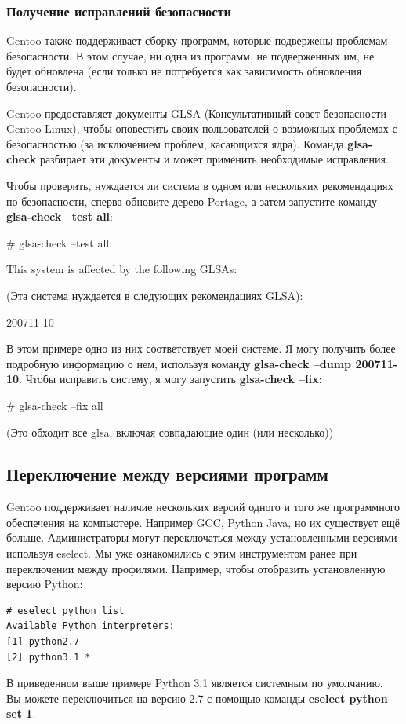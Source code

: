 \documentclass[10pt]{book}
\begin{document}
\subsubsection{Получение исправлений безопасности}

Gentoo также поддерживает сборку программ, которые подвержены проблемам безопасности. В этом случае, ни одна из программ, не подверженных им, не будет обновлена (если только не потребуется как зависимость обновления безопасности).

Gentoo предоставляет документы GLSA (Консультативный совет безопасности Gentoo Linux), чтобы оповестить своих пользователей о возможных проблемах с безопасностью (за исключением проблем, касающихся ядра). Команда \textbf{glsa-check} разбирает эти документы и может применить необходимые исправления.

Чтобы проверить, нуждается ли система в одном или нескольких рекомендациях по безопасности,  сперва обновите дерево Portage, а затем запустите команду \textbf{glsa-check --test all}:

\begin{tcolorbox}
\# glsa-check --test all:

This system is affected by the following GLSAs:

(Эта система нуждается в следующих рекомендациях GLSA):

200711-10
\end{tcolorbox}
В этом примере одно из них соответствует моей системе. Я могу получить более подробную информацию о нем, используя команду \textbf{glsa-check --dump 200711-10}. Чтобы исправить систему, я могу запустить  \textbf{glsa-check --fix}:

\begin{tcolorbox}
\# glsa-check --fix all 

(Это обходит все glsa, включая совпадающие один (или несколько))
\end{tcolorbox}

\subsection{Переключение между версиями программ}
Gentoo поддерживает наличие нескольких версий одного и того же программного обеспечения на компьютере. Например GCC, Python Java, но их существует ещё больше. Администраторы могут переключаться между установленными версиями используя eselect. Мы уже ознакомились с этим инструментом ранее при переключении между профилями.
Например, чтобы отобразить установленную версию Python:
\begin{tcolorbox}
\begin{lstlisting}
# eselect python list
Available Python interpreters:
[1] python2.7
[2] python3.1 *
\end{lstlisting}
\end{tcolorbox}
В приведенном выше примере Python 3.1 является системным по умолчанию. Вы можете переключиться на версию 2.7 с помощью команды \textbf{eselect python set 1}.
\end{document}
